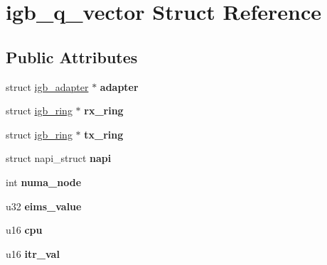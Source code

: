 \hypertarget{structigb__q__vector}{
\section{igb\_\-q\_\-vector Struct Reference}
\label{structigb__q__vector}
}
\subsection*{Public Attributes}
\begin{DoxyCompactItemize}
\item 
\hypertarget{structigb__q__vector_aac6764259ed9a7303d41bf7ac10c267d}{
struct \hyperlink{structigb__adapter}{igb\_\-adapter} $\ast$ {\bfseries adapter}}
\label{structigb__q__vector_aac6764259ed9a7303d41bf7ac10c267d}

\item 
\hypertarget{structigb__q__vector_aee90c739057d225a4b6eb313360fce1c}{
struct \hyperlink{structigb__ring}{igb\_\-ring} $\ast$ {\bfseries rx\_\-ring}}
\label{structigb__q__vector_aee90c739057d225a4b6eb313360fce1c}

\item 
\hypertarget{structigb__q__vector_a1ac65273e9ee6be1f1deb63dd99f243d}{
struct \hyperlink{structigb__ring}{igb\_\-ring} $\ast$ {\bfseries tx\_\-ring}}
\label{structigb__q__vector_a1ac65273e9ee6be1f1deb63dd99f243d}

\item 
\hypertarget{structigb__q__vector_a6186fff2c22581851ea3ba33a62a0041}{
struct napi\_\-struct {\bfseries napi}}
\label{structigb__q__vector_a6186fff2c22581851ea3ba33a62a0041}

\item 
\hypertarget{structigb__q__vector_ae91db951e1cbd3074ac298d387bbb88d}{
int {\bfseries numa\_\-node}}
\label{structigb__q__vector_ae91db951e1cbd3074ac298d387bbb88d}

\item 
\hypertarget{structigb__q__vector_a420487ae96b53622350aa87937a5ce67}{
u32 {\bfseries eims\_\-value}}
\label{structigb__q__vector_a420487ae96b53622350aa87937a5ce67}

\item 
\hypertarget{structigb__q__vector_af6cd6dc0f6edafb14b770eceab7663eb}{
u16 {\bfseries cpu}}
\label{structigb__q__vector_af6cd6dc0f6edafb14b770eceab7663eb}

\item 
\hypertarget{structigb__q__vector_a9c237a85658429a1e13b8b88fb021aae}{
u16 {\bfseries itr\_\-val}}
\label{structigb__q__vector_a9c237a85658429a1e13b8b88fb021aae}


\end{DoxyCompactItemize}
